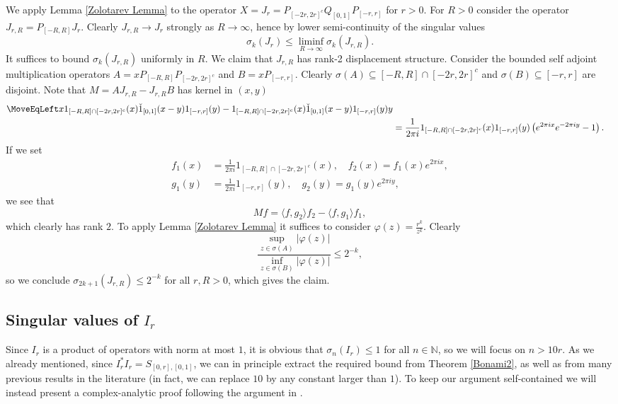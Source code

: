 \documentclass[12pt]{amsart}
\numberwithin{equation}{section}
\newcommand{\N}{\mathbb{N}}
\newcommand{\abs}[1]{| #1 |}
\renewcommand{\phi}{\varphi}
\begin{document}
We apply Lemma \ref{Zolotarev Lemma} to the operator $X = J_r = P_{[-2r, 2r]^c} Q_{[0,1]} P_{[-r,r]}$ for $r>0$. For $R>0$ consider the operator $J_{r,R} = P_{[-R,R]} J_r$. Clearly $J_{r,R} \to J_r$ strongly as $R\to \infty$, hence by lower semi-continuity of the singular values
\[
\sigma_k(J_{r}) \leq \liminf_{R\to \infty} \sigma_k(J_{r,R}). 
\]
It suffices to bound $\sigma_k(J_{r,R})$ uniformly in $R$. We claim that $J_{r,R}$ has rank-2 displacement structure. Consider the bounded self adjoint multiplication operators $A = x P_{[-R,R]} P_{[-2r,2r]^c}$ and $B = x P_{[-r,r]}$. Clearly $\sigma(A) \subseteq [-R,R] \cap [-2r,2r]^c$ and $\sigma(B) \subseteq [-r,r]$ are disjoint. Note that $M = A J_{r,R} - J_{r,R} B$ has kernel in $(x,y)$
\begin{align*}
\MoveEqLeft x 1_{[-R,R]\cap[-2r,2r]^c}(x) \check{1}_{[0,1]}(x-y) 1_{[-r,r]}(y) - 1_{[-R,R]\cap[-2r,2r]^c}(x) \check{1}_{[0,1]}(x-y) 1_{[-r,r]}(y) y\\
&=  \frac{1}{2\pi i} 1_{[-R,R]\cap[-2r,2r]^c}(x) 1_{[-r,r]}(y) \left(e^{2\pi i x} e^{-2\pi i y} - 1 \right).
\end{align*}
If we set 
\begin{align*}
f_1(x) &= \frac{1}{2\pi i} 1_{[-R,R]\cap[-2r,2r]^c}(x), \quad f_2(x) = f_1(x) e^{2\pi i x},\\
g_1(y) &= \frac{1}{2\pi i} 1_{[-r,r]}(y), \quad g_2(y) = g_1(y) e^{2\pi i y},
\end{align*}
we see that
\[
Mf = \langle f, g_2\rangle f_2 - \langle f, g_1\rangle f_1,
\]
which clearly has rank $2$. To apply Lemma \ref{Zolotarev Lemma} it suffices to consider $\phi(z) =\frac{r^k}{z^k}$. Clearly
\[
\frac{\sup_{z\in \sigma(A)}\abs{\phi(z)}}{\inf_{z\in \sigma(B)} \abs{\phi(z)}} \leq 2^{-k},
\]
so we conclude $\sigma_{2k+1}(J_{r,R}) \leq 2^{-k}$ for all $r,R>0$, which gives the claim.

\fi


\subsection{Singular values of $I_r$}
Since $I_r$ is a product of operators with norm at most $1$, it is obvious that $\sigma_n(I_r)\le 1$ for all $n\in\N$, so we will focus on $n > 10r$. As we already mentioned, since $I_r^* I_r = S_{[0,r],[0,1]}$, we can in principle extract the required bound from Theorem \ref{Bonami2}, as well as from many previous results in the literature (in fact, we can replace $10$ by any constant larger than $1$). To keep our argument self-contained we will instead present a complex-analytic proof following the argument in \cite{kulikov_2026}.
\end{document}
